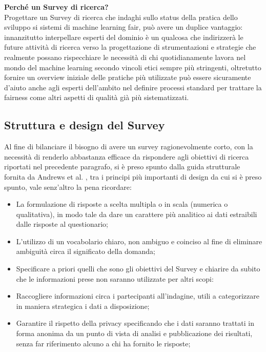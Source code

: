     \textbf{Perché un Survey di ricerca?}\\
    Progettare un Survey di ricerca che indaghi sullo status della pratica dello sviluppo si sistemi di machine learning fair, può avere un duplice vantaggio: innanzitutto interpellare esperti del dominio è un qualcosa che indirizzerà le future attività di ricerca verso la progettazione di strumentazioni e strategie che realmente possano rispecchiare le necessità di chi quotidianamente lavora nel mondo del machine learning secondo vincoli etici sempre più stringenti, oltretutto fornire un overview iniziale delle pratiche più utilizzate può essere sicuramente d'aiuto anche agli esperti dell'ambito nel definire processi standard per trattare la fairness come altri aspetti di qualità già più sistematizzati.
  
    \subsection{Struttura e design del Survey}
    Al fine di bilanciare il bisogno di avere un survey ragionevolmente corto, con la necessità di renderlo abbastanza efficace da rispondere agli obiettivi di ricerca riportati nel precedente paragrafo, si è preso spunto dalla guida strutturale fornita da Andrews et al. \cite{andrews2007conducting}, tra i principi più importanti di design da cui si è preso spunto, vale senz'altro la pena ricordare:
    
    \begin{itemize}
        \item La formulazione di risposte a scelta multipla o in scala (numerica o qualitativa), in modo tale da dare un carattere più analitico ai dati estraibili dalle risposte al questionario;
        \item L'utilizzo di un vocabolario chiaro, non ambiguo e coinciso al fine di eliminare ambiguità circa il significato della domanda;
        \item Specificare a priori quelli che sono gli obiettivi del Survey e chiarire da subito che le informazioni prese non saranno utilizzate per altri scopi:
        \item Raccogliere informazioni circa i partecipanti all'indagine, utili a categorizzare in maniera strategica i dati a disposizione;
        \item Garantire il rispetto della privacy specificando che i dati saranno trattati in forma anonima da un punto di vista di analisi e pubblicazione dei risultati, senza far riferimento alcuno a chi ha fornito le risposte;
    \end{itemize}
    

